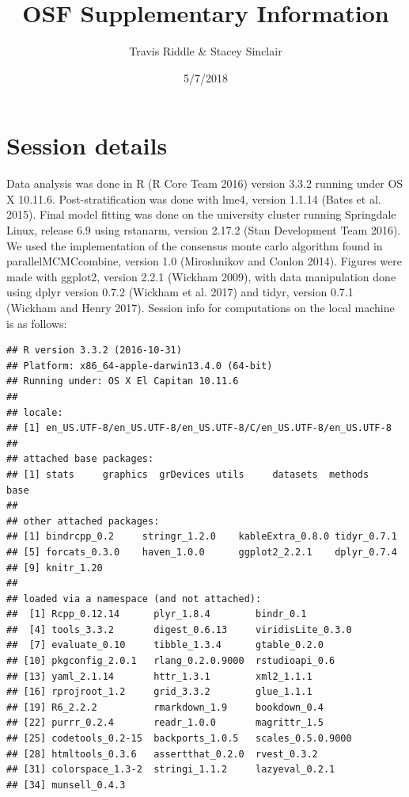 \documentclass[]{article}
\title{OSF Supplementary Information}
\author{Travis Riddle \& Stacey Sinclair}
\date{5/7/2018}
\theoremstyle{definition}
\theoremstyle{definition}
\theoremstyle{remark}
\begin{document}
\maketitle

\section{Session details}\label{session-details}

Data analysis was done in R (R Core Team 2016) version 3.3.2 running
under OS X 10.11.6. Post-stratification was done with lme4, version
1.1.14 (Bates et al. 2015). Final model fitting was done on the
university cluster running Springdale Linux, release 6.9 using rstanarm,
version 2.17.2 (Stan Development Team 2016). We used the implementation
of the consensus monte carlo algorithm found in parallelMCMCcombine,
version 1.0 (Miroshnikov and Conlon 2014). Figures were made with
ggplot2, version 2.2.1 (Wickham 2009), with data manipulation done using
dplyr version 0.7.2 (Wickham et al. 2017) and tidyr, version 0.7.1
(Wickham and Henry 2017). Session info for computations on the local
machine is as follows:

\begin{verbatim}
## R version 3.3.2 (2016-10-31)
## Platform: x86_64-apple-darwin13.4.0 (64-bit)
## Running under: OS X El Capitan 10.11.6
## 
## locale:
## [1] en_US.UTF-8/en_US.UTF-8/en_US.UTF-8/C/en_US.UTF-8/en_US.UTF-8
## 
## attached base packages:
## [1] stats     graphics  grDevices utils     datasets  methods   base     
## 
## other attached packages:
## [1] bindrcpp_0.2     stringr_1.2.0    kableExtra_0.8.0 tidyr_0.7.1     
## [5] forcats_0.3.0    haven_1.0.0      ggplot2_2.2.1    dplyr_0.7.4     
## [9] knitr_1.20      
## 
## loaded via a namespace (and not attached):
##  [1] Rcpp_0.12.14      plyr_1.8.4        bindr_0.1        
##  [4] tools_3.3.2       digest_0.6.13     viridisLite_0.3.0
##  [7] evaluate_0.10     tibble_1.3.4      gtable_0.2.0     
## [10] pkgconfig_2.0.1   rlang_0.2.0.9000  rstudioapi_0.6   
## [13] yaml_2.1.14       httr_1.3.1        xml2_1.1.1       
## [16] rprojroot_1.2     grid_3.3.2        glue_1.1.1       
## [19] R6_2.2.2          rmarkdown_1.9     bookdown_0.4     
## [22] purrr_0.2.4       readr_1.0.0       magrittr_1.5     
## [25] codetools_0.2-15  backports_1.0.5   scales_0.5.0.9000
## [28] htmltools_0.3.6   assertthat_0.2.0  rvest_0.3.2      
## [31] colorspace_1.3-2  stringi_1.1.2     lazyeval_0.2.1   
## [34] munsell_0.4.3
\end{verbatim}
\end{document}
